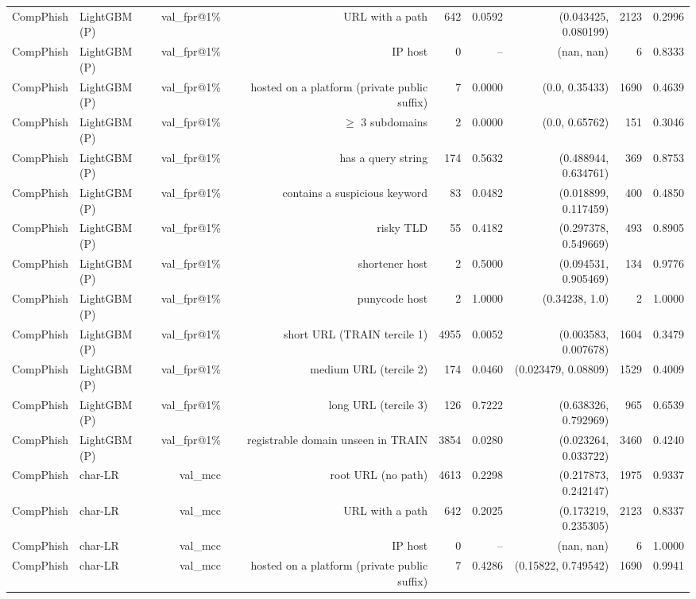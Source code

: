 \begin{table}[t]
\begin{tabular}{llrrrrrrr}
CompPhish & LightGBM (P) & val\_fpr@1\% & URL with a path & 642 & 0.0592 & (0.043425, 0.080199) & 2123 & 0.2996 \\
CompPhish & LightGBM (P) & val\_fpr@1\% & IP host & 0 & -- & (nan, nan) & 6 & 0.8333 \\
CompPhish & LightGBM (P) & val\_fpr@1\% & hosted on a platform (private public suffix) & 7 & 0.0000 & (0.0, 0.35433) & 1690 & 0.4639 \\
CompPhish & LightGBM (P) & val\_fpr@1\% & $\geq$ 3 subdomains & 2 & 0.0000 & (0.0, 0.65762) & 151 & 0.3046 \\
CompPhish & LightGBM (P) & val\_fpr@1\% & has a query string & 174 & 0.5632 & (0.488944, 0.634761) & 369 & 0.8753 \\
CompPhish & LightGBM (P) & val\_fpr@1\% & contains a suspicious keyword & 83 & 0.0482 & (0.018899, 0.117459) & 400 & 0.4850 \\
CompPhish & LightGBM (P) & val\_fpr@1\% & risky TLD & 55 & 0.4182 & (0.297378, 0.549669) & 493 & 0.8905 \\
CompPhish & LightGBM (P) & val\_fpr@1\% & shortener host & 2 & 0.5000 & (0.094531, 0.905469) & 134 & 0.9776 \\
CompPhish & LightGBM (P) & val\_fpr@1\% & punycode host & 2 & 1.0000 & (0.34238, 1.0) & 2 & 1.0000 \\
CompPhish & LightGBM (P) & val\_fpr@1\% & short URL (TRAIN tercile 1) & 4955 & 0.0052 & (0.003583, 0.007678) & 1604 & 0.3479 \\
CompPhish & LightGBM (P) & val\_fpr@1\% & medium URL (tercile 2) & 174 & 0.0460 & (0.023479, 0.08809) & 1529 & 0.4009 \\
CompPhish & LightGBM (P) & val\_fpr@1\% & long URL (tercile 3) & 126 & 0.7222 & (0.638326, 0.792969) & 965 & 0.6539 \\
CompPhish & LightGBM (P) & val\_fpr@1\% & registrable domain unseen in TRAIN & 3854 & 0.0280 & (0.023264, 0.033722) & 3460 & 0.4240 \\
CompPhish & char-LR & val\_mcc & root URL (no path) & 4613 & 0.2298 & (0.217873, 0.242147) & 1975 & 0.9337 \\
CompPhish & char-LR & val\_mcc & URL with a path & 642 & 0.2025 & (0.173219, 0.235305) & 2123 & 0.8337 \\
CompPhish & char-LR & val\_mcc & IP host & 0 & -- & (nan, nan) & 6 & 1.0000 \\
CompPhish & char-LR & val\_mcc & hosted on a platform (private public suffix) & 7 & 0.4286 & (0.15822, 0.749542) & 1690 & 0.9941 \\

\end{tabular}
\end{table}
